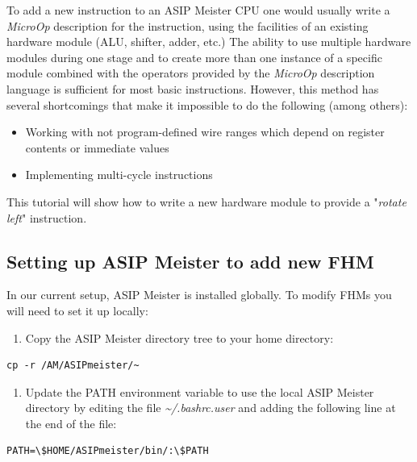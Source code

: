 To add a new instruction to an ASIP Meister CPU one would usually write
a \emph{MicroOp} description for the instruction, using the facilities
of an existing hardware module (ALU, shifter, adder, etc.) The ability
to use multiple hardware modules during one stage and to create more
than one instance of a specific module combined with the operators
provided by the \emph{MicroOp} description language is sufficient for
most basic instructions. However, this method has several shortcomings
that make it impossible to do the following (among others):

\begin{itemize}
\item
  Working with not program-defined wire ranges which depend on register
  contents or immediate values
\item
  Implementing multi-cycle instructions
\end{itemize}

This tutorial will show how to write a new hardware module to provide a
"\emph{rotate left}" instruction.

\hypertarget{setting-up-asip-meister-to-add-new-fhm}{%
\subsection{Setting up ASIP Meister to add new
FHM}\label{setting-up-asip-meister-to-add-new-fhm}}

In our current setup, ASIP Meister is installed globally. To modify FHMs
you will need to set it up locally:

\begin{enumerate}
\def\labelenumi{\arabic{enumi}.}
\item
  Copy the ASIP Meister directory tree to your home directory:
\end{enumerate}

\begin{lstlisting}
cp -r /AM/ASIPmeister/~
\end{lstlisting}

\begin{enumerate}
\def\labelenumi{\arabic{enumi}.}
\setcounter{enumi}{1}
\item
  Update the PATH environment variable to use the local ASIP Meister
  directory by editing the file \emph{\textasciitilde/.bashrc.user} and
  adding the following line at the end of the file:
\end{enumerate}

\begin{lstlisting}
PATH=\$HOME/ASIPmeister/bin/:\$PATH
\end{lstlisting}

